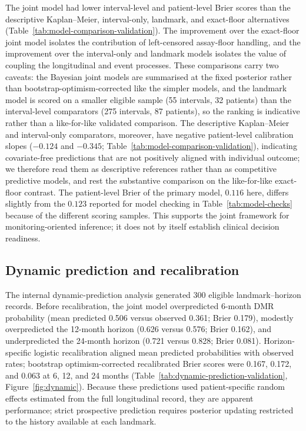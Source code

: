 \documentclass[11pt]{article}
\begin{document}
The joint model had lower interval-level and patient-level Brier scores
than the descriptive Kaplan--Meier, interval-only, landmark, and
exact-floor alternatives (Table~\ref{tab:model-comparison-validation}). The improvement
over the exact-floor joint model isolates the contribution of
left-censored assay-floor handling, and the improvement over the
interval-only and landmark models isolates the value of coupling the
longitudinal and event processes. These comparisons carry two caveats: the
Bayesian joint models are summarised at the fixed posterior rather than
bootstrap-optimism-corrected like the simpler models, and the landmark model
is scored on a smaller eligible sample (55 intervals, 32 patients) than the
interval-level comparators (275 intervals, 87 patients), so the ranking is
indicative rather than a like-for-like validated comparison. The
descriptive Kaplan--Meier and interval-only comparators, moreover, have negative
patient-level calibration slopes ($-0.124$ and $-0.345$;
Table~\ref{tab:model-comparison-validation}), indicating covariate-free predictions
that are not positively aligned with individual outcome; we therefore read them as
descriptive references rather than as competitive predictive models, and rest the
substantive comparison on the like-for-like exact-floor contrast. The
patient-level Brier of the primary model, $0.116$ here, differs slightly from
the $0.123$ reported for model checking in Table~\ref{tab:model-checks}
because of the different scoring samples. This supports the joint framework
for monitoring-oriented inference; it does not by itself establish clinical
decision readiness.



\subsection{Dynamic prediction and recalibration}

The internal dynamic-prediction analysis generated 300 eligible
landmark--horizon records. Before recalibration, the joint model
overpredicted 6-month DMR probability (mean predicted 0.506 versus
observed 0.361; Brier 0.179), modestly overpredicted the 12-month horizon
(0.626 versus 0.576; Brier 0.162), and underpredicted the 24-month horizon
(0.721 versus 0.828; Brier 0.081). Horizon-specific logistic recalibration
aligned mean predicted probabilities with observed rates; bootstrap
optimism-corrected recalibrated Brier scores were 0.167, 0.172, and 0.063
at 6, 12, and 24 months (Table~\ref{tab:dynamic-prediction-validation},
Figure~\ref{fig:dynamic}). Because these predictions used patient-specific
random effects estimated from the full longitudinal record, they are
apparent performance; strict prospective prediction requires posterior
updating restricted to the history available at each landmark.
\end{document}
